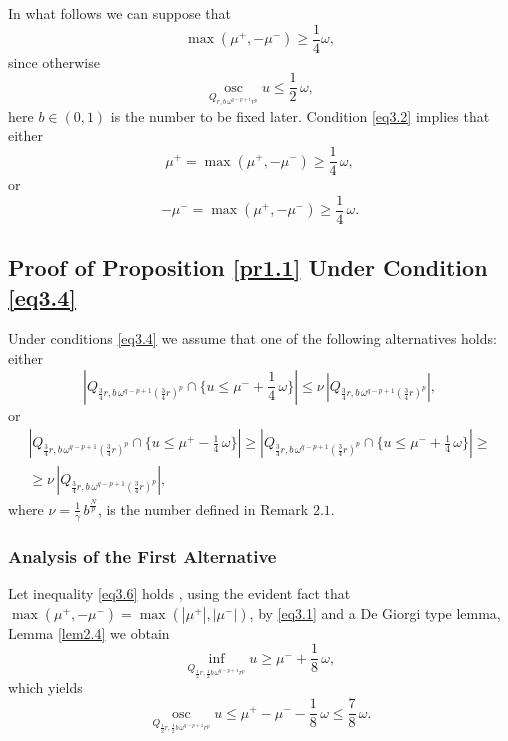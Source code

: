 \documentclass[a4paper,11pt,fullpage]{article}
\DeclareMathOperator*{\osc}{osc}
\numberwithin{equation}{section}
\begin{document}
In what follows  we can suppose that
\begin{equation}\label{eq3.2}
\max(\mu^+, -\mu^-) \geqslant \frac{1}{4}\omega,
\end{equation}
since otherwise 
\begin{equation}\label{eq3.3}
\osc\limits_{Q_{r, b\, \omega^{q-p+1} r^p}} u\leqslant \frac{1}{2}\,\omega,
\end{equation}
here $b\in (0, 1)$ is the number to be fixed later.
Condition \eqref{eq3.2} implies that either
\begin{equation}\label{eq3.4}
\mu^+=\max (\mu^+, -\mu^-) \geqslant \frac{1}{4}\,\omega,
\end{equation}
or
\begin{equation}\label{eq3.5}
-\mu^-=\max (\mu^+, -\mu^-) \geqslant \frac{1}{4}\,\omega.
\end{equation}

\subsection{Proof of Proposition \ref{pr1.1} Under Condition \eqref{eq3.4}}
Under conditions \eqref{eq3.4} we  assume that one of the following alternatives holds:
either
\begin{equation}\label{eq3.6}
|Q_{\frac{3}{4}r, b\,\omega^{q-p+1} (\frac{3}{4}r)^p}\cap\{u\leqslant \mu^-+\frac{1}{4}\,\omega\}|\leqslant \nu\,|Q_{\frac{3}{4}r, b\,\omega^{q-p+1} (\frac{3}{4}r)^p}|,
\end{equation}
or
\begin{multline}\label{eq3.7}
|Q_{\frac{3}{4}r, b\,\omega^{q-p+1} (\frac{3}{4}r)^p}\cap\{u\leqslant \mu^+-\frac{1}{4}\,\omega\}|\geqslant
|Q_{\frac{3}{4}r, b\,\omega^{q-p+1} (\frac{3}{4} r)^p}\cap\{u\leqslant \mu^-+\frac{1}{4}\,\omega\}|\geqslant\\\geqslant \nu\,|Q_{\frac{3}{4}r, b\,\omega^{q-p+1} (\frac{3}{4} r)^p}|,
\end{multline}
where $\nu=\frac{1}{\gamma}\,b^{\frac{N}{p}}$,  is the number defined in Remark $2.1$.

\subsubsection{Analysis of the First Alternative}
Let inequality \eqref{eq3.6} holds , using the evident fact that $\max(\mu^+, -\mu^-)=\max(|\mu^+|, |\mu^-|)$, by \eqref{eq3.1} and  a De Giorgi type lemma, Lemma \ref{lem2.4} we obtain
$$\inf\limits_{Q_{\frac{1}{2} r, \frac{1}{2} b\,\omega^{q-p+1} r^p}} u \geqslant \mu^-+\frac{1}{8}\,\omega,$$
which yields
\begin{equation}\label{eq3.8}
\osc\limits_{Q_{\frac{1}{2}r, \frac{1}{2} b\,\omega^{q-p+1} r^p}} u\leqslant \mu^+-\mu^--\frac{1}{8}\,\omega\leqslant \frac{7}{8}\,\omega.
\end{equation}
\end{document}
